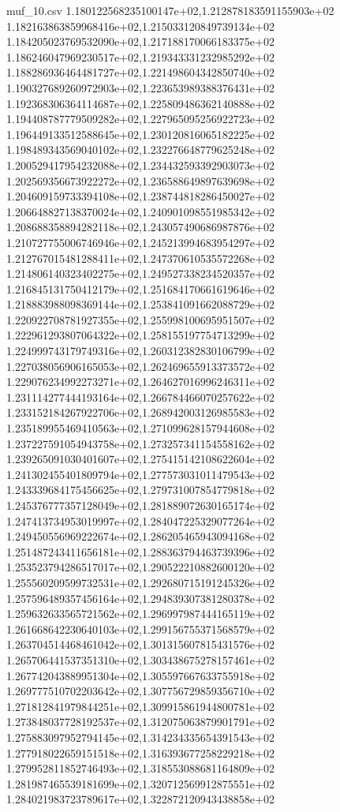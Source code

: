 \begin{filecontents*}{muf_10.csv}
1.180122568235100147e+02,1.212878183591155903e+02
1.182163863859968416e+02,1.215033120849739134e+02
1.184205023769532090e+02,1.217188170066183375e+02
1.186246047969230517e+02,1.219343331232985292e+02
1.188286936464481727e+02,1.221498604342850740e+02
1.190327689260972903e+02,1.223653989388376431e+02
1.192368306364114687e+02,1.225809486362140888e+02
1.194408787779509282e+02,1.227965095256922723e+02
1.196449133512588645e+02,1.230120816065182225e+02
1.198489343569040102e+02,1.232276648779625248e+02
1.200529417954232088e+02,1.234432593392903073e+02
1.202569356673922272e+02,1.236588649897639698e+02
1.204609159733394108e+02,1.238744818286450027e+02
1.206648827138370024e+02,1.240901098551985342e+02
1.208688358894282118e+02,1.243057490686987876e+02
1.210727755006746946e+02,1.245213994683954297e+02
1.212767015481288411e+02,1.247370610535572268e+02
1.214806140323402275e+02,1.249527338234520357e+02
1.216845131750412179e+02,1.251684170661619646e+02
1.218883988098369144e+02,1.253841091662088729e+02
1.220922708781927355e+02,1.255998100695951507e+02
1.222961293807064322e+02,1.258155197754713299e+02
1.224999743179749316e+02,1.260312382830106799e+02
1.227038056906165053e+02,1.262469655913373572e+02
1.229076234992273271e+02,1.264627016996246311e+02
1.231114277444193164e+02,1.266784466070257622e+02
1.233152184267922706e+02,1.268942003126985583e+02
1.235189955469410563e+02,1.271099628157944608e+02
1.237227591054943758e+02,1.273257341154558162e+02
1.239265091030401607e+02,1.275415142108622604e+02
1.241302455401809794e+02,1.277573031011479543e+02
1.243339684175456625e+02,1.279731007854779818e+02
1.245376777357128049e+02,1.281889072630165174e+02
1.247413734953019997e+02,1.284047225329077264e+02
1.249450556969222674e+02,1.286205465943094168e+02
1.251487243411656181e+02,1.288363794463739396e+02
1.253523794286517017e+02,1.290522210882600120e+02
1.255560209599732531e+02,1.292680715191245326e+02
1.257596489357456164e+02,1.294839307381280378e+02
1.259632633565721562e+02,1.296997987444165119e+02
1.261668642230640103e+02,1.299156755371568579e+02
1.263704514468461042e+02,1.301315607815431576e+02
1.265706441537351310e+02,1.303438675278157461e+02
1.267742043889951304e+02,1.305597667633755918e+02
1.269777510702203642e+02,1.307756729859356710e+02
1.271812841979844251e+02,1.309915861944800781e+02
1.273848037728192537e+02,1.312075063879901791e+02
1.275883097952794145e+02,1.314234335654391543e+02
1.277918022659151518e+02,1.316393677258229218e+02
1.279952811852746493e+02,1.318553088681164809e+02
1.281987465539181699e+02,1.320712569912875551e+02
1.284021983723789617e+02,1.322872120943438858e+02

\end{filecontents*}
